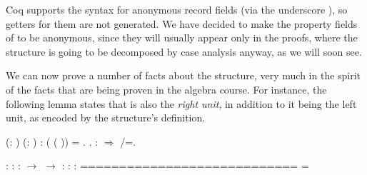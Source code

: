 \coqdocemptyline


Coq supports the syntax for anonymous record fields (via the
underscore \coqdocvar{\_}), so getters for them are not generated. We have
decided to make the property fields of  to be anonymous,
since they will usually appear only in the proofs, where the structure
is going to be decomposed by case analysis anyway, as we will soon
see.


We can now prove a number of facts about the structure, very much in
the spirit of the facts that are being proven in the algebra course.
For instance, the following lemma states that  is also the
\textit{right unit}, in addition to it being the left unit, as encoded by the
structure's definition.




\begin{coqdoccode}
\coqdocemptyline
\coqdocnoindent
{}   (:  ) (: ) : (   ( )) = .\coqdoceol
\coqdocnoindent
{}.\coqdoceol
\coqdocnoindent
{}: \ensuremath{\Rightarrow}\coqdocvar{\_}    \coqdocvar{\_}  \coqdocvar{\_} \coqdocvar{\_} /=.\coqdoceol
\coqdocemptyline
\end{coqdoccode}


\coqdoceol
\coqdocemptyline
\coqdocindent{1.00em}
 : \coqdoceol
\coqdocindent{1.00em}
 : \coqdoceol
\coqdocindent{1.00em}
 :  \ensuremath{\rightarrow}  \ensuremath{\rightarrow} \coqdoceol
\coqdocindent{1.00em}
 : \coqdoceol
\coqdocindent{1.00em}
 :  \coqdoceol
\coqdocindent{1.00em}
 :   \coqdoceol
\coqdocindent{1.00em}
============================\coqdoceol
\coqdocindent{1.50em}
   = 

\coqdocemptyline


